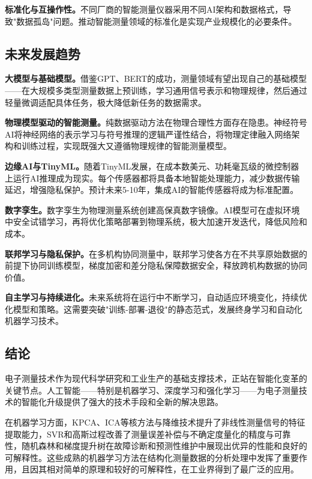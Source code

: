 \documentclass[12pt,a4paper]{article}
\numberwithin{figure}{section}
\numberwithin{table}{section}
\numberwithin{equation}{section}
\begin{document}
\textbf{标准化与互操作性。}不同厂商的智能测量仪器采用不同AI架构和数据格式，导致"数据孤岛"问题。推动智能测量领域的标准化是实现产业规模化的必要条件。

\subsection{未来发展趋势}

\textbf{大模型与基础模型。}借鉴GPT、BERT的成功，测量领域有望出现自己的基础模型——在大规模多类型测量数据上预训练，学习通用信号表示和物理规律，然后通过轻量微调适配具体任务，极大降低新任务的数据需求。

\textbf{物理模型驱动的智能测量。}纯数据驱动方法在物理合理性方面存在隐患。神经符号AI将神经网络的表示学习与符号推理的逻辑严谨性结合，将物理定律融入网络架构和训练过程，实现既强大又遵循物理规律的智能测量模型。

\textbf{边缘AI与TinyML。}随着TinyML发展，在成本数美元、功耗毫瓦级的微控制器上运行AI推理成为现实。每个传感器都将具备本地智能处理能力，减少数据传输延迟，增强隐私保护。预计未来5-10年，集成AI的智能传感器将成为标准配置。

\textbf{数字孪生。}数字孪生为物理测量系统创建高保真数字镜像。AI模型可在虚拟环境中安全试错学习，再将优化策略部署到物理系统，极大加速开发迭代，降低风险和成本。

\textbf{联邦学习与隐私保护。}在多机构协同测量中，联邦学习使各方在不共享原始数据的前提下协同训练模型，梯度加密和差分隐私保障数据安全，释放跨机构数据的协同价值。

\textbf{自主学习与持续进化。}未来系统将在运行中不断学习，自动适应环境变化，持续优化模型和策略。这需要突破"训练-部署-退役"的静态范式，发展终身学习和自动化机器学习技术。

\subsection{结论}

电子测量技术作为现代科学研究和工业生产的基础支撑技术，正站在智能化变革的关键节点。人工智能——特别是机器学习、深度学习和强化学习——为电子测量技术的智能化升级提供了强大的技术手段和全新的解决思路。

在机器学习方面，KPCA、ICA等核方法与降维技术提升了非线性测量信号的特征提取能力，SVR和高斯过程改善了测量误差补偿与不确定度量化的精度与可靠性，随机森林和梯度提升树在故障诊断和预测性维护中展现出优异的性能和良好的可解释性。这些成熟的机器学习方法在结构化测量数据的分析处理中发挥了重要作用，且因其相对简单的原理和较好的可解释性，在工业界得到了最广泛的应用。
\end{document}
